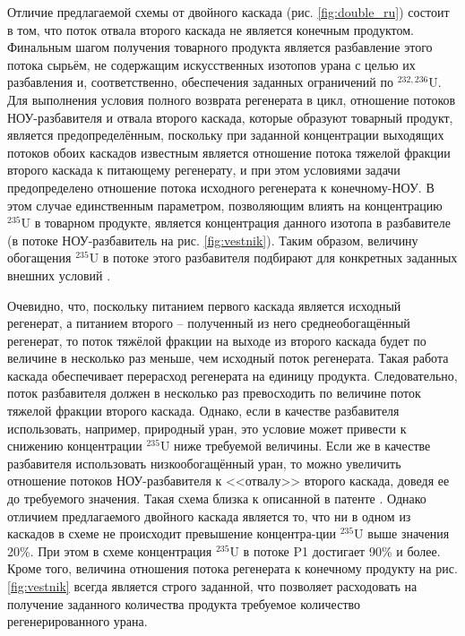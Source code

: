 Отличие предлагаемой схемы от двойного каскада (рис. \ref{fig:double_ru}) состоит в том, что поток отвала второго каскада не является конечным продуктом.
Финальным шагом получения товарного продукта является разбавление этого потока сырьём, не содержащим искусственных изотопов урана с целью их разбавления и, соответственно, обеспечения заданных ограничений по $^{232,236}$U.
Для выполнения условия полного возврата регенерата в цикл, отношение потоков НОУ-разбавителя и отвала второго каскада, которые образуют товарный продукт, является предопределённым, поскольку при заданной концентрации выходящих потоков обоих каскадов известным является отношение потока тяжелой фракции второго каскада к питающему регенерату, и при этом условиями задачи предопределено отношение потока исходного регенерата к конечному-НОУ.
В этом случае единственным параметром, позволяющим влиять на концентрацию $^{235}$U в товарном продукте, является концентрация данного изотопа в разбавителе (в потоке НОУ-разбавитель на рис. \ref{fig:vestnik}).
Таким образом, величину обогащения $^{235}$U в потоке этого разбавителя подбирают для конкретных заданных внешних условий \cite{smirnovObogashchenieRegenerirovannogoUrana2018}.

Очевидно, что, поскольку питанием первого каскада является исходный регенерат, а питанием второго -- полученный из него среднеобогащённый регенерат, то поток тяжёлой фракции на выходе из второго каскада будет по величине в несколько раз меньше, чем исходный поток регенерата. Такая работа каскада обеспечивает перерасход регенерата на единицу продукта. Следовательно, поток разбавителя должен в несколько раз превосходить по величине поток тяжелой фракции второго каскада. Однако, если в качестве разбавителя использовать, например, природный уран, это условие может привести к снижению концентрации $^{235}$U ниже требуемой величины. Если же в качестве разбавителя использовать низкообогащённый уран, то можно увеличить отношение потоков НОУ-разбавителя к <<отвалу>> второго каскада, доведя ее до требуемого значения.  
Такая схема близка к описанной в патенте \cite{zhurinSposobIzotopnogoVosstanovleniya2010}. Однако отличием предлагаемого двойного каскада является то, что ни в одном из каскадов в схеме не происходит превышение концентра-ции $^{235}$U выше значения 20\%. При этом в схеме  \cite{zhurinSposobIzotopnogoVosstanovleniya2010} концентрация $^{235}$U в потоке P1 достигает 90\% и более. Кроме того, величина отношения потока регенерата к конечному продукту на рис. \ref{fig:vestnik} всегда является строго заданной, что позволяет расходовать на получение заданного количества продукта требуемое количество регенерированного урана.


